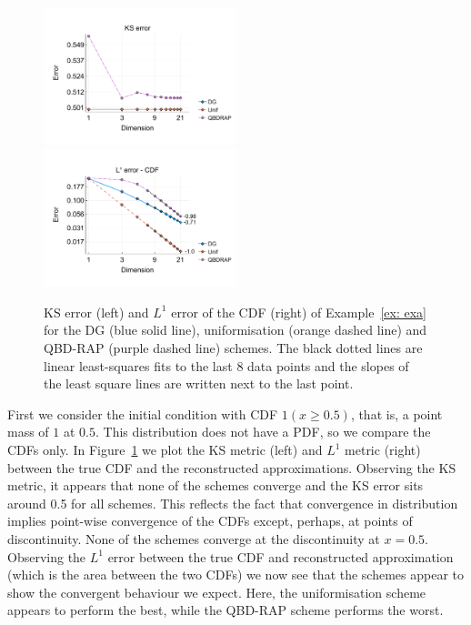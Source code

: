 \begin{example}\label{ex: exa}
	\begin{figure}[h]
		\centering
		\includegraphics[width=0.5\textwidth,trim={0.5cm 0.8cm 0.2cm 1.25cm},clip]{chapter6/figs/comp/fun1/meshs_ks_error_formatted.pdf}%
		\includegraphics[width=0.5\textwidth,trim={0.5cm 0.8cm 0.2cm 1.25cm},clip]{chapter6/figs/comp/fun1/meshs_l1_cdf_error_formatted.pdf}
		\caption{KS error (left) and \(L^1\) error of the CDF (right) of Example~\ref{ex: exa} for the DG (blue solid line), uniformisation (orange dashed line) and QBD-RAP (purple dashed line) schemes. The black dotted lines are linear least-squares fits to the last 8 data points and the slopes of the least square lines are written next to the last point.}
		\label{fig: fun 1 comp} 
	\end{figure}
	First we consider the initial condition with CDF \(1(x\geq 0.5)\), that is, a point mass of \(1\) at \(0.5\). This distribution does not have a PDF, so we compare the CDFs only. In Figure~\ref{fig: fun 1 comp} we plot the KS metric (left) and \(L^1\) metric (right) between the true CDF and the reconstructed approximations. Observing the KS metric, it appears that none of the schemes converge and the KS error sits around 0.5 for all schemes. This reflects the fact that convergence in distribution implies point-wise convergence of the CDFs except, perhaps, at points of discontinuity. None of the schemes converge at the discontinuity at \(x=0.5\). Observing the \(L^1\) error between the true CDF and reconstructed approximation (which is the area between the two CDFs) we now see that the schemes appear to show the convergent behaviour we expect. Here, the uniformisation scheme appears to perform the best, while the QBD-RAP scheme performs the worst.


\end{example}
